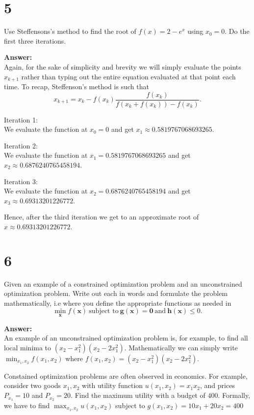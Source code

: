 \documentclass{article}
\begin{document}
\section*{5}
Use Steffensons's method to find the root of $f(x) = 2 - e^x$ using $x_0 = 0$.
Do the first three iterations.

\textbf{Answer:}\\
Again, for the sake of simplicity and brevity we will simply evaluate the
points $x_{k+1}$ rather than typing out the entire equation evaluated at that
point each time. To recap, Steffenson's method is such that
\begin{equation*}
    x_{k+1} = x_k - f(x_k)\frac{f(x_k)}{f(x_k + f(x_k))-f(x_k)}.
\end{equation*}

Iteration 1:\\
We evaluate the function at $x_0 = 0$ and get $x_1 \approx 0.5819767068693265$.

Iteration 2:\\
We evaluate the function at $x_1 = 0.5819767068693265$ and
get $x_2 \approx 0.6876240765458194$.

Iteration 3:\\
We evaluate the function at $x_2 = 0.6876240765458194$
and get $x_3 \approx 0.69313201226772$.

Hence, after the third iteration we get to an approximate root of\\
${x \approx 0.69313201226772}$.

\section*{6}
Given an example of a constrained optimization problem and an unconstrained
optimization problem. Write out each in words and formulate the problem
mathematically, i.e where you define the appropriate functions as needed in
\[\min_{\bm{x}}f(\bm{x}) \ \text{subject to} \ \bm{g}(\bm{x}) = \bm{0} \
    \text{and} \ \bm{h}(\bm{x}) \leq 0.\]

\textbf{Answer:}\\
An example of an unconstrained optimization problem is, for example, to
find all local minima to $(x_2 - x_1^2)(x_2-2x_1^2)$. Mathematically we
can simply write $\min_{x_1,x_2} f(x_1, x_2)$ where
$f(x_1,x_2) = (x_2 - x_1^2)(x_2-2x_1^2)$.

Constained optimization problems are often observed in economics. For example,
consider two goods $x_1, x_2$ with utility function $u(x_1, x_2) = x_1x_2$, and
prices $P_{x_1} = 10$ and $P_{x_2} = 20$. Find the maximum utility with a
budget of $400$. Formally, we have to find $\max_{x_1,x_2}u(x_1, x_2)$
subject to ${g(x_1, x_2) = 10x_1 + 20x_2 = 400}$
\end{document}
